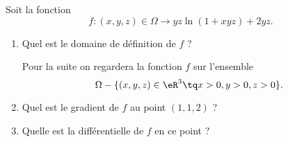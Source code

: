 
\begin{exercice}\label{exoexamens-0002}

    Soit la fonction 
    \begin{equation}
        f\colon (x,y,z)\in \Omega\to yz\ln(1+xyz)+2yz.
    \end{equation}
    \begin{enumerate}
        \item
            Quel est le domaine de définition de \( f\) ?

            Pour la suite on regardera la fonction \( f\) sur l'ensemble
            \begin{equation}
                \Omega-\{ (x,y,z)\in \eR^3\tq x>0,y>0,z>0 \}.
            \end{equation}
            
        \item
            Quel est le gradient de \( f\) au point \( (1,1,2)\) ?
        \item
            Quelle est la différentielle de \( f\) en ce point ?
    \end{enumerate}

\end{exercice}
